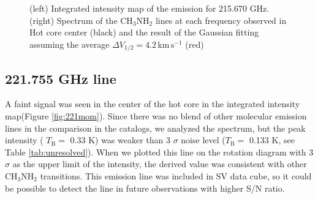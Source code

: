 \begin{figure}[htp]
\begin{center}
\begin{minipage}{0.98\textwidth}
\begin{center}
\begin{minipage}{0.48\textwidth}
\begin{center}
\label{fig:215spec}
\end{center}
\end{minipage}
\end{center}
\end{minipage}
\caption{(left) Integrated intensity map of the emission for 215.670 GHz. (right) Spectrum of the CH$_3$NH$_2$ lines at each frequency observed in Hot core center (black)  and the result of the Gaussian fitting assuming the average $\Delta V_{1/2} = 4.2\, \mathrm{km\,s^{-1}}$ (red)}
\end{center}
\end{figure}

\subsection*{221.755 GHz line}
A faint signal was seen in the center of the hot core in the integrated intensity map(Figure \ref{fig:221mom}).
Since there was no blend of other molecular emission lines in the comparison in the catalogs, we analyzed the spectrum, 
but the peak intensity ( $T_{\mathrm{B}}=$ 0.33 K) was weaker than 
3 $\sigma $ noise level ($T_{\mathrm{B}}=$ 0.133 K, see Table \ref{tab:unresolved}). 
When we plotted this line on the rotation diagram with 3$\sigma$ as the upper limit of the intensity, 
the derived value was consistent with other CH$_3$NH$_2$ transitions. This emission line was included in SV data cube, 
so it could be possible to detect the line in future observations with higher S/N ratio.

